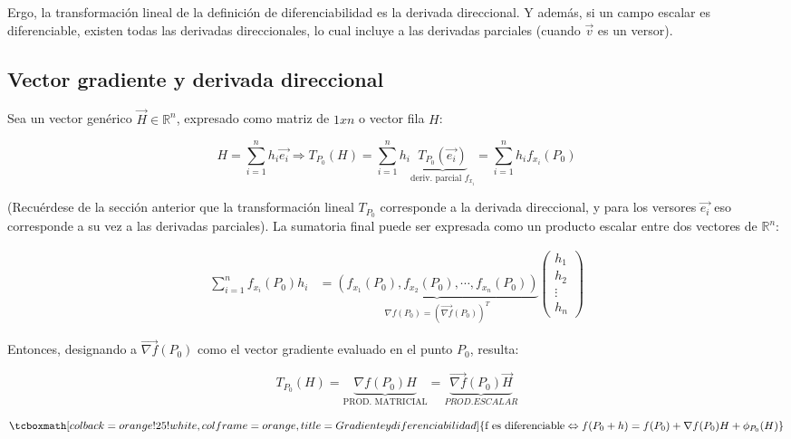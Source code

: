 \documentclass{article}
\renewcommand{\Bbb}{\mathbb}
\begin{document}
Ergo, la transformación lineal de la definición de diferenciabilidad es la derivada direccional. Y además, si un campo escalar es diferenciable, existen todas las derivadas direccionales, lo cual incluye a las derivadas parciales (cuando $\overrightarrow{v}$ es un versor).

\subsection{Vector gradiente y derivada direccional}

Sea un vector genérico $\overrightarrow{H} \in \Bbb R^n$, expresado como matriz de $1xn$ o vector fila $H$:

\begin{equation}
H = \sum\limits_{i=1}^{n} {h_i \overrightarrow{e_i}} \Rightarrow T_{P_0}(H) = \sum\limits_{i=1}^{n}{ h_i \underbrace{T_{P_0}(\overrightarrow{e_i})}_{\text{deriv. parcial } f_{x_i}} } = \sum\limits_{i=1}^{n}{ h_i f_{x_i}(P_0) }
\end{equation}

(Recuérdese de la sección anterior que la transformación lineal $T_{P_0}$ corresponde a la derivada direccional, y para los versores $\overrightarrow{e_i}$ eso corresponde a su vez a las derivadas parciales). La sumatoria final puede ser expresada como un producto escalar entre dos vectores de $\Bbb R^n$:

\begin{align}
    \sum\limits_{i=1}^{n}{ f_{x_i}(P_0) h_i } &= \underbrace{ (f_{x_1}(P_0), f_{x_2}(P_0), \cdots, f_{x_n}(P_0)) }_{ \nabla{f(P_0)} = (\overrightarrow{\nabla{f}}(P_0))^T }
    \begin{pmatrix}
           h_1 \\
           h_2 \\
           \vdots \\
           h_n
    \end{pmatrix}
\end{align}

Entonces, designando a $\overrightarrow{\nabla{f}}(P_0)$ como el vector gradiente evaluado en el punto $P_0$, resulta:

\begin{equation}
T_{P_0}(H) = \underbrace{ \nabla{f}(P_0) H }_{\text{PROD. MATRICIAL}} = \underbrace{ \overrightarrow{\nabla{f}}(P_0) \overrightarrow{H} }_{PROD. ESCALAR}
\end{equation}

\begin{equation}
\tcboxmath[colback=orange!25!white,colframe=orange, title=Gradiente y diferenciabilidad]
{ \text{f es diferenciable} \Leftrightarrow f(P_0 + h) = f(P_0) + \nabla{f}(P_0) H + \phi_{P_0}(H) }
\end{equation}
\end{document}

